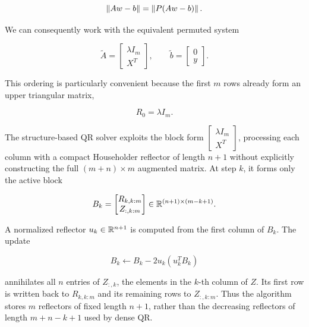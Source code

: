 \begin{equation}
    \left\|Aw-b\right\| = \left\|P(Aw-b)\right\|.
\end{equation}

\noindent We can consequently work with the equivalent permuted system

\begin{equation}
    \label{eq:permuted_augmented} \tilde{A} = \begin{bmatrix} \lambda I_m \\ X^T \end{bmatrix}, \qquad \tilde{b} = \begin{bmatrix} 0 \\ y \end{bmatrix}.
\end{equation}

\noindent This ordering is particularly convenient because the first $m$ rows already form an upper triangular matrix,

\begin{equation}
    R_0=\lambda I_m.
\end{equation}

\noindent The structure-based QR solver exploits the block form \(\begin{bmatrix}\lambda I_m\\X^T\end{bmatrix}\), processing each column with a compact Householder reflector of length \(n+1\) without explicitly constructing the full \((m+n)\times m\) augmented matrix. At step $k$, it forms only the active block

\begin{equation}
\label{eq:structure_active_block}
    B_k=
    \begin{bmatrix}
        R_{k,k:m}\\
        Z_{:,k:m}
    \end{bmatrix}
    \in\mathbb{R}^{(n+1)\times(m-k+1)}.
\end{equation}

\noindent A normalized reflector $u_k\in\mathbb{R}^{n+1}$ is computed from the first
column of $B_k$. The update

\begin{equation}
    B_k\leftarrow B_k-2u_k(u_k^T B_k)
\end{equation}

\noindent annihilates all $n$ entries of $Z_{:,k}$, the elements in the $k$-th column of $Z$. Its first row is written back to $R_{k,k:m}$ and its remaining rows to $Z_{:,k:m}$. Thus the
algorithm stores $m$ reflectors of fixed length $n+1$, rather than the
decreasing reflectors of length $m+n-k+1$ used by dense QR.

